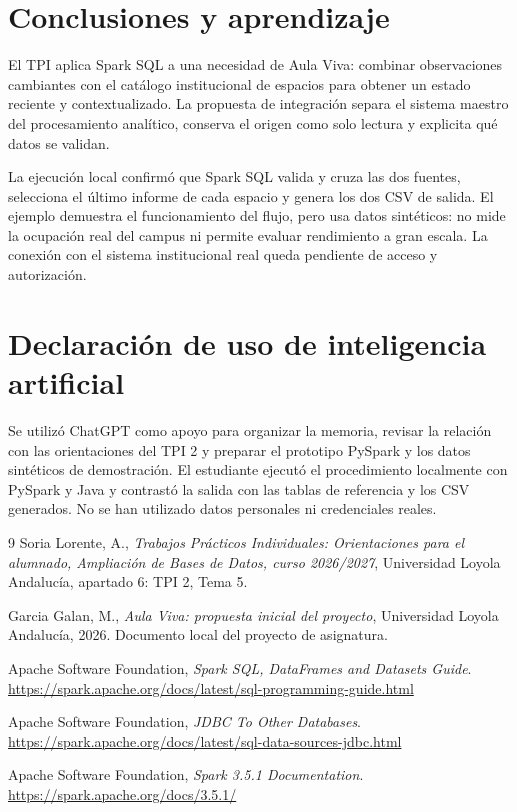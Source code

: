 \documentclass[a4paper,12pt]{article}
\begin{document}
\section{Conclusiones y aprendizaje}
El TPI aplica Spark SQL a una necesidad de Aula Viva: combinar observaciones cambiantes con el catálogo institucional de espacios para obtener un estado reciente y contextualizado. La propuesta de integración separa el sistema maestro del procesamiento analítico, conserva el origen como solo lectura y explicita qué datos se validan.

La ejecución local confirmó que Spark SQL valida y cruza las dos fuentes, selecciona el último informe de cada espacio y genera los dos CSV de salida. El ejemplo demuestra el funcionamiento del flujo, pero usa datos sintéticos: no mide la ocupación real del campus ni permite evaluar rendimiento a gran escala. La conexión con el sistema institucional real queda pendiente de acceso y autorización.

\section{Declaración de uso de inteligencia artificial}
Se utilizó ChatGPT como apoyo para organizar la memoria, revisar la relación con las orientaciones del TPI 2 y preparar el prototipo PySpark y los datos sintéticos de demostración. El estudiante ejecutó el procedimiento localmente con PySpark y Java y contrastó la salida con las tablas de referencia y los CSV generados. No se han utilizado datos personales ni credenciales reales.

\begin{thebibliography}{9}
Soria Lorente, A., \textit{Trabajos Prácticos Individuales: Orientaciones para el alumnado, Ampliación de Bases de Datos, curso 2026/2027}, Universidad Loyola Andalucía, apartado 6: TPI 2, Tema 5.

Garcia Galan, M., \textit{Aula Viva: propuesta inicial del proyecto}, Universidad Loyola Andalucía, 2026. Documento local del proyecto de asignatura.

Apache Software Foundation, \textit{Spark SQL, DataFrames and Datasets Guide}. \url{https://spark.apache.org/docs/latest/sql-programming-guide.html}

Apache Software Foundation, \textit{JDBC To Other Databases}. \url{https://spark.apache.org/docs/latest/sql-data-sources-jdbc.html}

Apache Software Foundation, \textit{Spark 3.5.1 Documentation}. \url{https://spark.apache.org/docs/3.5.1/}
\end{thebibliography}
\end{document}
